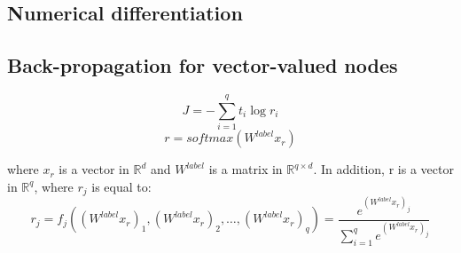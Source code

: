 \documentclass[twoside,12pt]{article}
\begin{document}
\subsection{Numerical differentiation}
\subsection{Back-propagation for vector-valued nodes}
\begin{equation}
J = -\sum_{i=1}^{q}t_i\log{r_i}
\end{equation}
\begin{equation}
r = softmax(W^{label}x_r)
\end{equation}

where $x_r$ is a vector in $\mathbb{R}^d$ and $W^{label}$ is a matrix in $\mathbb{R}^{q\times d}$. In addition, r is a vector in $\mathbb{R}^q$, where $r_j$ is equal to:
\begin{equation}
r_j=f_j((W^{label}x_r)_1,(W^{label}x_r)_2,\ldots,(W^{label}x_r)_q)=\frac{e^{(W^{label}x_r)_j}}{\sum_{i=1}^{q}e^{(W^{label}x_r)_j}}
\end{equation}
\end{document}
